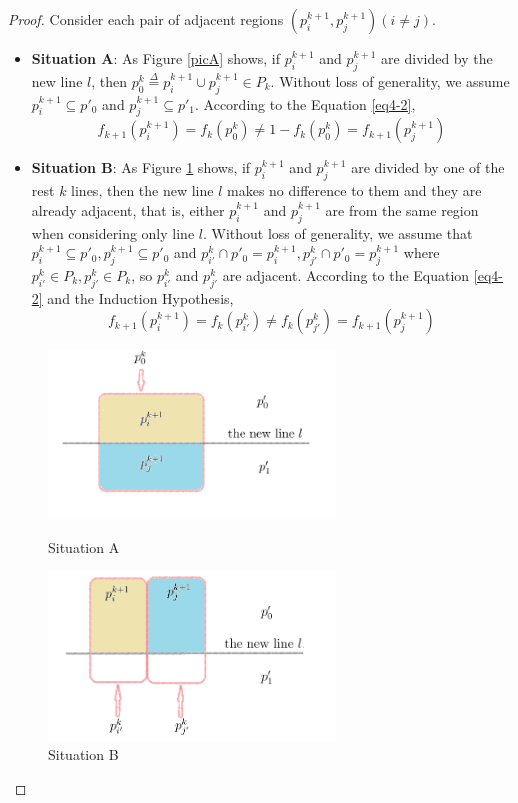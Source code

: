 \documentclass[12pt,a4paper]{article}
\theoremstyle{definition}
\begin{document}
\begin{enumerate}
\begin{proof}
        Consider each pair of adjacent regions $(p_i^{k+1}, p_j^{k+1}) (i \neq j)$.
        \begin{itemize}
        \item \textbf{Situation A}: As Figure \ref{picA} shows, if $p_i^{k+1}$ and $p_j^{k+1}$ are divided by the new line $l$, then $p_0^k \stackrel{\Delta}{=} p_i^{k+1} \cup p_j^{k+1} \in P_k$. Without loss of generality, we assume $p_i^{k+1} \subseteq p'_0$ and $p_j^{k+1} \subseteq p'_1$. According to the Equation \eqref{eq4-2},
                \begin{displaymath}
                f_{k+1}(p_i^{k+1}) = f_k(p_0^k) \neq 1 - f_k(p_0^k) = f_{k+1}(p_j^{k+1})
                \end{displaymath}
        \item \textbf{Situation B}: As Figure \ref{picB} shows, if $p_i^{k+1}$ and $p_j^{k+1}$ are divided by one of the rest $k$ lines, then the new line $l$ makes no difference to them and they are already adjacent, that is, either $p_i^{k+1}$ and $p_j^{k+1}$ are from the same region when considering only line $l$. Without loss of generality, we assume that $p_i^{k+1} \subseteq p'_0, p_j^{k+1} \subseteq p'_0$ and $p_{i'}^k \cap p'_0 = p_i^{k+1}, p_{j'}^k \cap p'_0 = p_j^{k+1}$ where $p_{i'}^k \in P_k, p_{j'}^k \in P_k$, so $p_{i'}^k$ and $p_{j'}^k$ are adjacent. According to the Equation \eqref{eq4-2} and the Induction Hypothesis,
            \begin{displaymath}
            f_{k+1}(p_i^{k+1}) = f_k(p_{i'}^k) \neq f_k(p_{j'}^k) = f_{k+1}(p_j^{k+1})
            \end{displaymath}
        \end{itemize}
        \begin{figure}[htbp]
          \centering
          \begin{minipage}[b]{0.4\linewidth}
          \includegraphics[width=3in]{pic1.png}
          \caption{Situation A}\label{picA}
          \end{minipage}
          \begin{minipage}[b]{0.4\linewidth}
          \includegraphics[width=3in]{pic2.png}
          \caption{Situation B}\label{picB}
          \end{minipage}
        \end{figure}


\end{proof}
\end{enumerate}
\end{document}
